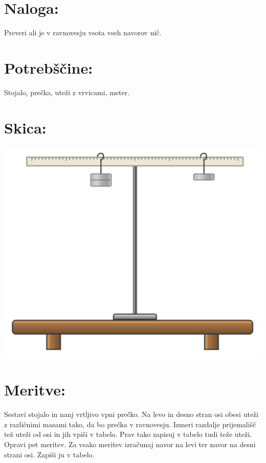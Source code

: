 \documentclass[a4paper]{article}
\begin{document}



\section*{Naloga:} %

Preveri ali je v ravnovesju vsota vseh navorov nič.

\section*{Potrebščine:}

Stojalo, prečka, uteži z vrvicami, meter.

\section*{Skica:}

\includegraphics[scale=0.5]{skica.png}

\section*{Meritve:}

Sestavi stojalo in nanj vrtljivo vpni prečko. Na levo in desno stran osi obesi uteži z različnimi masami tako, da bo prečka v ravnovesju. Izmeri razdalje prijemališč tež uteži od osi in jih vpiši v tabelo. Prav tako zapisuj v tabelo tudi teže uteži. Opravi pet meritev. Za vsako meritev izračunaj navor na levi ter navor na desni strani osi. Zapiši ju v tabelo.
\end{document}

